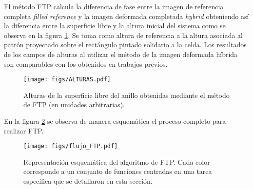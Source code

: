 \documentclass[../main.tex]{subfiles}
\begin{document}
El método FTP calcula la diferencia de fase entre la imagen de referencia completa \textit{filled reference} y la imagen deformada completada \textit{hybrid} obteniendo así la diferencia entre la superficie libre y la altura inicial del sistema como se observa en la figura \ref{fig:height}. Se toma como altura de referencia a la altura asociada al patrón proyectado sobre el rectángulo pintado solidario a la celda. Los resultados de los campos de alturas al utilizar el método de la imagen deformada híbrida son comparables con los obtenidos en trabajos previos. 

\begin{figure}[H]
    \centering
    \texttt{[image: figs/ALTURAS.pdf]}
    \caption{Alturas de la superficie libre del anillo obtenidas mediante el método de FTP (en unidades arbitrarias). }
    \label{fig:height}
\end{figure}


En la figura \ref{fig:flujo_ftp} se observa de manera esquemática el proceso completo para realizar FTP. 

\begin{figure}[H]
    \centering
    \texttt{[image: figs/flujo\_FTP.pdf]}
    \caption{Representación esquemática del algoritmo de FTP. Cada color corresponde a un conjunto de funciones centradas en una tarea específica que se detallaron en esta sección. }
    \label{fig:flujo_ftp}
\end{figure}

\end{document}
